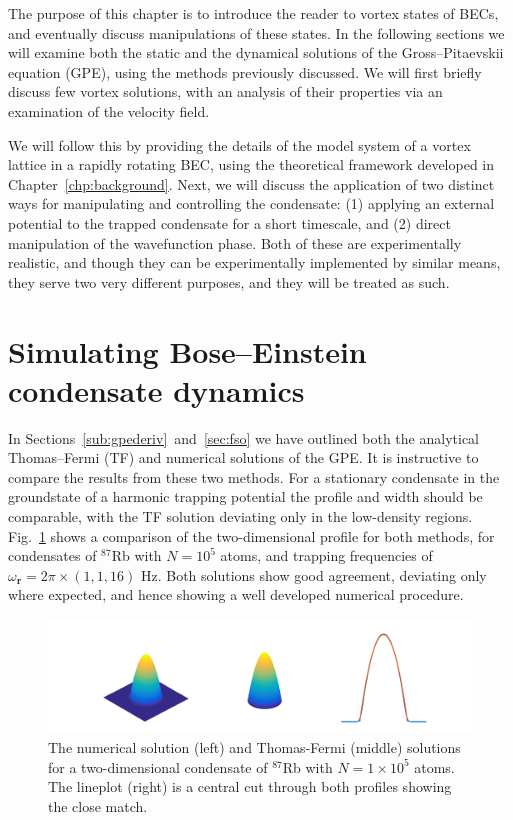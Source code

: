 The purpose of this chapter is to introduce the reader to vortex states of BECs, and eventually discuss manipulations of these states. In the following sections we will examine both the static and the dynamical solutions of the Gross--Pitaevskii equation (GPE), using the methods previously discussed. We will first briefly discuss few vortex solutions, with an analysis of their properties via an examination of the velocity field.

We will follow this by providing the details of the model system of a vortex lattice in a rapidly rotating BEC, using the theoretical framework developed in Chapter~\ref{chp:background}. Next, we will discuss the application of two distinct ways for manipulating and controlling the condensate: (1) applying an external potential to the trapped condensate for a short timescale, and (2) direct manipulation of the wavefunction phase. Both of these are experimentally realistic, and though they can be experimentally implemented by similar means, they serve two very different purposes, and they will be treated as such.

\section{Simulating Bose--Einstein condensate dynamics}

In Sections~\ref{sub:gpederiv}~and~\ref{sec:fso} we have outlined both the analytical Thomas--Fermi (TF) and numerical solutions of the GPE. It is instructive to compare the results from these two methods. For a stationary condensate in the groundstate of a harmonic trapping potential the profile and width should be comparable, with the TF solution deviating only in the low-density regions. Fig.~\ref{fig:gpe_tf_3} shows a comparison of the two-dimensional profile for both methods, for condensates of $^{87}$Rb with $N=10^{5}$ atoms, and trapping frequencies of $\omega_{\mathbf{r}}=2\pi\times (1, 1, 16 )$ Hz. Both solutions show good agreement, deviating only where expected, and hence showing a well developed numerical procedure.
\begin{figure}\centering
    \includegraphics[width=\textwidth,trim=0ex 0ex 0ex 0ex]{Images/ch4_vtx/gpe_tf_3.pdf}
    \caption{The numerical solution (left) and Thomas-Fermi (middle) solutions for a two-dimensional condensate of $^{87}$Rb with $N=1\times 10^5$ atoms. The lineplot (right) is a central cut through both profiles showing the close match.}\label{fig:gpe_tf_3}
\end{figure}

